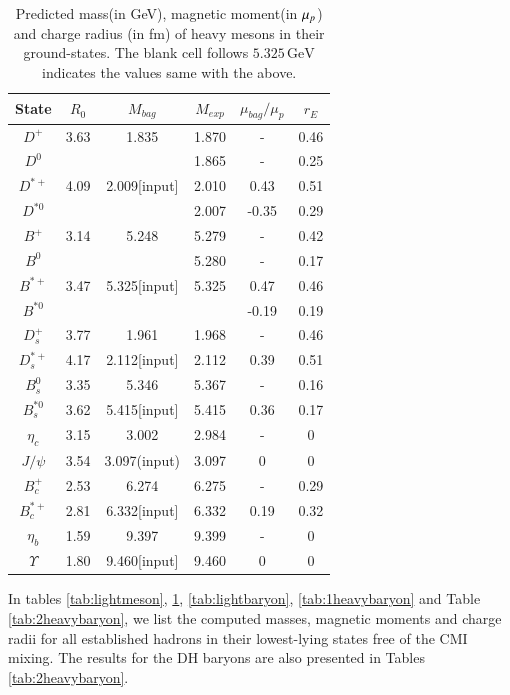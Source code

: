 \documentclass[12pt,onecolumn,floatfix,nofootinbib]{revtex4}
\begin{document}
\renewcommand{\tabcolsep}{0.3cm} \renewcommand{\arraystretch}{1.3}
\begin{table}[!htb]
\caption{Predicted mass(in GeV), magnetic moment(in $\protect\mu_{p}$) and
charge radius (in fm) of heavy mesons in their ground-states. The blank cell
follows $5.325\,\mathrm{GeV}$ indicates the values same with the above.}
\label{tab:heavymeson}%
\begin{tabular}{cccccc}
\hline\hline
\textrm{State} & $R_{0}$ & $M_{bag}$ & $M_{exp}$ & $\mu_{bag}/\mu_{p}$ & $%
r_{E}$ \\ \hline
$D^{+}$ & 3.63 & 1.835 & 1.870 & - & 0.46 \\
$D^{0}$ &  &  & 1.865 & - & 0.25 \\
$D^{\ast +}$ & 4.09 & 2.009[input] & 2.010 & 0.43 & 0.51 \\
$D^{\ast 0}$ &  &  & 2.007 & -0.35 & 0.29 \\
$B^{+}$ & 3.14 & 5.248 & 5.279 & - & 0.42 \\
$B^{0}$ &  &  & 5.280 & - & 0.17 \\
$B^{\ast +}$ & 3.47 & 5.325[input] & 5.325 & 0.47 & 0.46 \\
$B^{\ast 0}$ &  &  &  & -0.19 & 0.19 \\
$D_{s}^{+}$ & 3.77 & 1.961 & 1.968 & - & 0.46 \\
$D_{s}^{\ast +}$ & 4.17 & 2.112[input] & 2.112 & 0.39 & 0.51 \\
$B_{s}^{0}$ & 3.35 & 5.346 & 5.367 & - & 0.16 \\
$B_{s}^{\ast 0}$ & 3.62 & 5.415[input] & 5.415 & 0.36 & 0.17 \\
$\eta_{c}$ & 3.15 & 3.002 & 2.984 & - & 0 \\
$J/\psi$ & 3.54 & 3.097(input) & 3.097 & 0 & 0 \\
$B_{c}^{+}$ & 2.53 & 6.274 & 6.275 & - & 0.29 \\
$B_{c}^{\ast +}$ & 2.81 & 6.332[input] & 6.332 & 0.19 & 0.32 \\
$\eta_{b}$ & 1.59 & 9.397 & 9.399 & - & 0 \\
$\Upsilon$ & 1.80 & 9.460[input] & 9.460 & 0 & 0 \\ \hline\hline
\end{tabular}%
\end{table}

In tables \ref{tab:lightmeson}, \ref{tab:heavymeson}, \ref{tab:lightbaryon}, %
\ref{tab:1heavybaryon} and Table \ref{tab:2heavybaryon}, we list the
computed masses, magnetic moments and charge radii for all established
hadrons in their lowest-lying states free of the CMI mixing. The results for
the DH baryons are also presented in Tables \ref{tab:2heavybaryon}.
\end{document}
